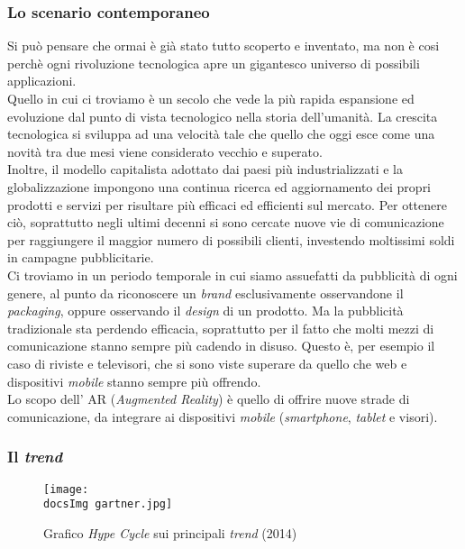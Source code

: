 \subsubsection{Lo scenario contemporaneo}
Si pu\`o pensare che ormai \`e gi\`a stato tutto scoperto e inventato, ma non \`e cosi perch\`e ogni rivoluzione tecnologica apre un gigantesco universo di possibili applicazioni. 
\\
Quello in cui ci troviamo \`e un secolo che vede la pi\`u rapida espansione ed evoluzione dal punto di vista tecnologico nella storia dell'umanit\`a. La crescita tecnologica si sviluppa ad una velocit\`a tale che quello che oggi esce come una novit\`a tra due mesi viene considerato vecchio e superato.
\\
Inoltre, il modello capitalista adottato dai paesi pi\`u industrializzati e la globalizzazione impongono una continua ricerca ed aggiornamento dei propri prodotti e servizi per risultare pi\`u efficaci ed efficienti sul mercato. Per ottenere ci\`o, soprattutto negli ultimi decenni si sono cercate nuove vie di comunicazione per raggiungere il maggior numero di possibili clienti, investendo moltissimi soldi in campagne pubblicitarie.
\\
Ci troviamo in un periodo temporale in cui siamo assuefatti da pubblicit\`a di ogni genere, al punto da riconoscere un \textit{brand} esclusivamente osservandone il \textit{packaging}, oppure osservando il \textit{design} di un prodotto.
Ma la pubblicit\`a tradizionale sta perdendo efficacia, soprattutto per il fatto che molti mezzi di comunicazione stanno sempre pi\`u cadendo in disuso. Questo \`e, per esempio il caso di riviste e televisori, che si sono viste superare da quello che web e dispositivi \textit{mobile} stanno sempre pi\`u offrendo.
\\
Lo scopo dell' AR (\textit{Augmented Reality}) \`e quello di offrire nuove strade di comunicazione, da integrare ai dispositivi \textit{mobile} (\textit{smartphone}, \textit{tablet} e visori).

\subsubsection{Il \textit{trend}}
\begin{figure}[H]
	\centering
	\texttt{[image: \\docsImg gartner.jpg]}
	\caption{Grafico \textit{Hype Cycle} sui principali \textit{trend} (2014)}
	\label{fig: Grafico Hype Cycle sui principali trend (2014)}
\end{figure}

